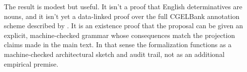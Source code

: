 \documentclass[12pt]{article}
\begin{document}
The result is modest but useful. It isn't a proof that English determinatives are nouns, and it isn't yet a data-linked proof over the full CGELBank annotation scheme described by \textcite{anon2025cgelbank}. It is an existence proof that the proposal can be given an explicit, machine-checked grammar whose consequences match the projection claims made in the main text. In that sense the formalization functions as a machine-checked architectural sketch and audit trail, not as an additional empirical premise.


\newpage
\printbibliography
\end{document}
